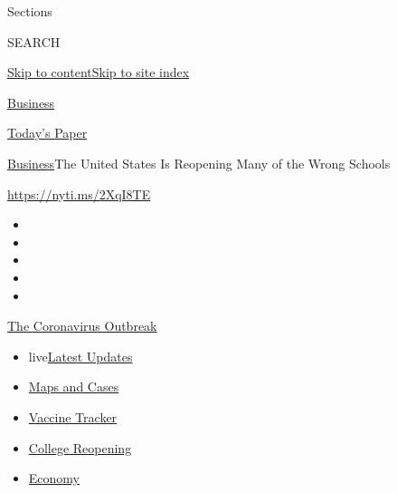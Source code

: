 Sections

SEARCH

\protect\hyperlink{site-content}{Skip to
content}\protect\hyperlink{site-index}{Skip to site index}

\href{https://www.nytimes3xbfgragh.onion/section/business}{Business}

\href{https://myaccount.nytimes3xbfgragh.onion/auth/login?response_type=cookie\&client_id=vi}{}

\href{https://www.nytimes3xbfgragh.onion/section/todayspaper}{Today's
Paper}

\href{/section/business}{Business}\textbar{}The United States Is
Reopening Many of the Wrong Schools

\url{https://nyti.ms/2XqI8TE}

\begin{itemize}
\item
\item
\item
\item
\item
\end{itemize}

\href{https://www.nytimes3xbfgragh.onion/news-event/coronavirus?action=click\&pgtype=Article\&state=default\&region=TOP_BANNER\&context=storylines_menu}{The
Coronavirus Outbreak}

\begin{itemize}
\tightlist
\item
  live\href{https://www.nytimes3xbfgragh.onion/2020/08/03/world/coronavirus-covid-19.html?action=click\&pgtype=Article\&state=default\&region=TOP_BANNER\&context=storylines_menu}{Latest
  Updates}
\item
  \href{https://www.nytimes3xbfgragh.onion/interactive/2020/us/coronavirus-us-cases.html?action=click\&pgtype=Article\&state=default\&region=TOP_BANNER\&context=storylines_menu}{Maps
  and Cases}
\item
  \href{https://www.nytimes3xbfgragh.onion/interactive/2020/science/coronavirus-vaccine-tracker.html?action=click\&pgtype=Article\&state=default\&region=TOP_BANNER\&context=storylines_menu}{Vaccine
  Tracker}
\item
  \href{https://www.nytimes3xbfgragh.onion/2020/08/02/us/covid-college-reopening.html?action=click\&pgtype=Article\&state=default\&region=TOP_BANNER\&context=storylines_menu}{College
  Reopening}
\item
  \href{https://www.nytimes3xbfgragh.onion/live/2020/08/03/business/stock-market-today-coronavirus?action=click\&pgtype=Article\&state=default\&region=TOP_BANNER\&context=storylines_menu}{Economy}
\end{itemize}

